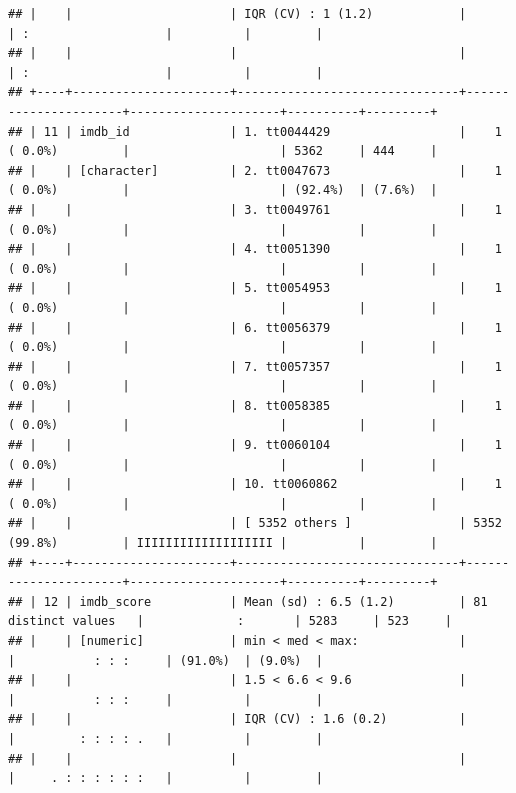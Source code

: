 \documentclass[11pt,preprint]{elsarticle}
\numberwithin{equation}{section}
\numberwithin{figure}{section}
\numberwithin{table}{section}
\begin{document}
\begin{verbatim}
## |    |                      | IQR (CV) : 1 (1.2)            |                      | :                   |          |         |
## |    |                      |                               |                      | :                   |          |         |
## +----+----------------------+-------------------------------+----------------------+---------------------+----------+---------+
## | 11 | imdb_id              | 1. tt0044429                  |    1 ( 0.0%)         |                     | 5362     | 444     |
## |    | [character]          | 2. tt0047673                  |    1 ( 0.0%)         |                     | (92.4%)  | (7.6%)  |
## |    |                      | 3. tt0049761                  |    1 ( 0.0%)         |                     |          |         |
## |    |                      | 4. tt0051390                  |    1 ( 0.0%)         |                     |          |         |
## |    |                      | 5. tt0054953                  |    1 ( 0.0%)         |                     |          |         |
## |    |                      | 6. tt0056379                  |    1 ( 0.0%)         |                     |          |         |
## |    |                      | 7. tt0057357                  |    1 ( 0.0%)         |                     |          |         |
## |    |                      | 8. tt0058385                  |    1 ( 0.0%)         |                     |          |         |
## |    |                      | 9. tt0060104                  |    1 ( 0.0%)         |                     |          |         |
## |    |                      | 10. tt0060862                 |    1 ( 0.0%)         |                     |          |         |
## |    |                      | [ 5352 others ]               | 5352 (99.8%)         | IIIIIIIIIIIIIIIIIII |          |         |
## +----+----------------------+-------------------------------+----------------------+---------------------+----------+---------+
## | 12 | imdb_score           | Mean (sd) : 6.5 (1.2)         | 81 distinct values   |             :       | 5283     | 523     |
## |    | [numeric]            | min < med < max:              |                      |           : : :     | (91.0%)  | (9.0%)  |
## |    |                      | 1.5 < 6.6 < 9.6               |                      |           : : :     |          |         |
## |    |                      | IQR (CV) : 1.6 (0.2)          |                      |         : : : : .   |          |         |
## |    |                      |                               |                      |     . : : : : : :   |          |         |

\end{verbatim}
\end{document}

